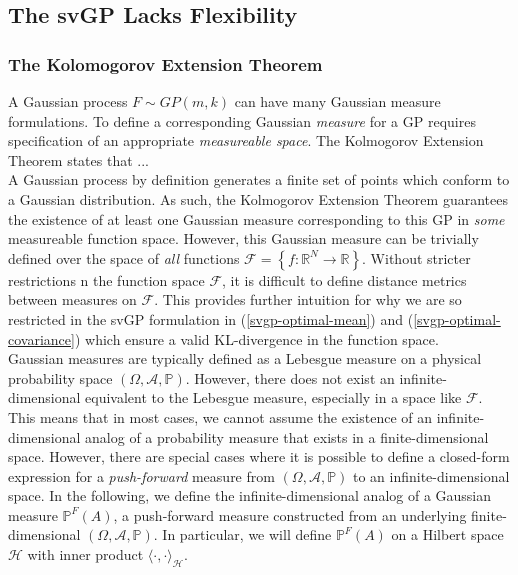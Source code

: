 \documentclass{article}
\numberwithin{equation}{section}
\begin{document}
\subsection{The svGP Lacks Flexibility}
\subsubsection{The Kolomogorov Extension Theorem}
A Gaussian process $F \sim GP(m, k)$ can have many Gaussian measure formulations. To define a corresponding Gaussian \textit{measure} for a GP requires specification of an appropriate \textit{measureable space}. The Kolmogorov Extension Theorem states that ...
\\ A Gaussian process by definition generates a finite set of points which conform to a Gaussian distribution. As such, the Kolmogorov Extension Theorem guarantees the existence of at least one Gaussian measure corresponding to this GP in \textit{some} measureable function space. However, this Gaussian measure can be trivially defined over the space of \textit{all} functions $\mathcal{F} = \left\{f: \mathbb{R}^{N} \rightarrow \mathbb{R} \right\}$. Without stricter restrictions n the function space $\mathcal{F}$, it is difficult to define distance metrics between measures on $\mathcal{F}$. This provides further intuition for why we are so restricted in the svGP formulation in (\ref{svgp-optimal-mean}) and (\ref{svgp-optimal-covariance}) which ensure a valid KL-divergence in the function space.
\\Gaussian measures are typically defined as a Lebesgue measure on a physical probability space $(\Omega, \mathcal{A}, \mathbb{P})$. However, there does not exist an infinite-dimensional equivalent to the Lebesgue measure, especially in a space like $\mathcal{F}$. This means that in most cases, we cannot assume the existence of an infinite-dimensional analog of a probability measure that exists in a finite-dimensional space. However, there are special cases where it is possible to define a closed-form expression for a \textit{push-forward} measure from $(\Omega, \mathcal{A}, \mathbb{P})$ to an infinite-dimensional space. In the following, we define the infinite-dimensional analog of a Gaussian measure  $\mathbb{P}^{F}(A)$, a push-forward measure constructed from an underlying finite-dimensional $(\Omega, \mathcal{A}, \mathbb{P})$. In particular, we will define $\mathbb{P}^{F}(A)$ on a Hilbert space $\mathcal{H}$ with inner product $\langle \cdot, \cdot \rangle_\mathcal{H}$.
\end{document}
